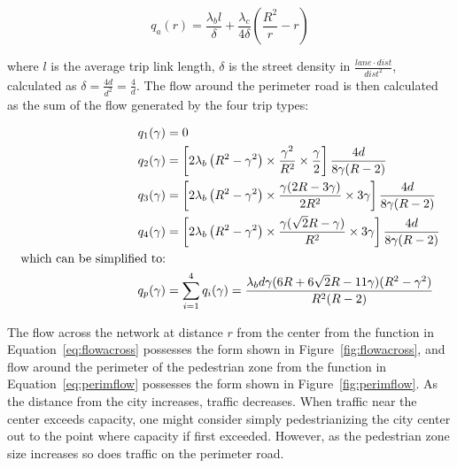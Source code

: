 \documentclass{article}
\begin{document}
\begin{equation}
    q_a(r) = \frac{\lambda_b l}{\delta} + \frac{\lambda_c}{4\delta} \left( \frac{R^2}{r} - r \right)
    \label{eq:flowacross}
\end{equation}

\noindent where $l$ is the average trip link length, $\delta$ is the street density in $\frac{lane \cdot dist}{dist^2}$, calculated as $\delta = \frac{4d}{d^2} = \frac{4}{d}$. The flow around the perimeter road is then calculated as the sum of the flow generated by the four trip types:

\begin{subequations}
\begin{align}
	q_1(\gamma) &= 0 \\
	q_2(\gamma) &= \left[2 \lambda_b \left(R^2 - \gamma^2\right) \times \frac{\gamma^2}{R^2} \times\frac{\gamma}{2}\right] \frac{4d}{8\gamma (R-2)}\\
	q_3(\gamma) &= \left[2 \lambda_b \left(R^2 - \gamma^2\right) \times \frac{\gamma (2R - 3\gamma)}{2R^2} \times  3\gamma\right] \frac{4d}{8\gamma (R-2)}\\
	q_4(\gamma) &= \left[2 \lambda_b \left(R^2 - \gamma^2\right) \times \frac{\gamma (\sqrt{2}R-\gamma)}{R^2} \times  3\gamma\right] \frac{4d}{8\gamma (R-2)}\\
	\notag\text{which can be simplified to:} & \\
	    q_p(\gamma) & = \sum\limits_{i=1}^4 q_i(\gamma) = \frac{\lambda_b d \gamma (6R + 6\sqrt{2}R - 11\gamma)(R^2 - \gamma^2)}{R^2(R-2)}
    \label{eq:perimflow}
\end{align}
\end{subequations}

\noindent The flow across the network at distance $r$ from the center from the function in Equation~\eqref{eq:flowacross} possesses the form shown in Figure~\ref{fig:flowacross}, and flow around the perimeter of the pedestrian zone from the function in Equation~\eqref{eq:perimflow} possesses the form shown in Figure~\ref{fig:perimflow}. As the distance from the city increases, traffic decreases. When traffic near the center exceeds capacity, one might consider simply pedestrianizing the city center out to the point where capacity if first exceeded. However, as the pedestrian zone size increases so does traffic on the perimeter road. 
\end{document}
